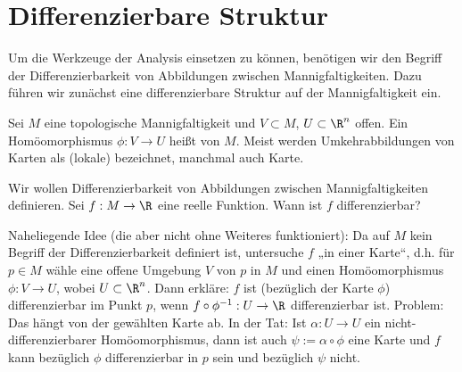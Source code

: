 
%

\section{Differenzierbare Struktur}

Um die Werkzeuge der Analysis einsetzen zu können, benötigen wir den Begriff der Differenzierbarkeit von Abbildungen zwischen Mannigfaltigkeiten.
Dazu führen wir zunächst eine differenzierbare Struktur auf der Mannigfaltigkeit ein.

\begin{df} \label{1.5}
    Sei $M$ eine topologische Mannigfaltigkeit und $V \subset M$, $U \subset \R^n$ offen.
    Ein Homöomorphismus $\phi: V \to U$ heißt  von $M$.
    Meist werden Umkehrabbildungen von Karten als (lokale)  bezeichnet, manchmal auch Karte.
\end{df}

Wir wollen Differenzierbarkeit von Abbildungen zwischen Mannigfaltigkeiten definieren.
Sei $f: M \to \R$ eine reelle Funktion.
Wann ist $f$ differenzierbar?

Naheliegende Idee (die aber nicht ohne Weiteres funktioniert):
Da auf $M$ kein Begriff der Differenzierbarkeit definiert ist, untersuche $f$ „in einer Karte“, d.h. für $p \in M$ wähle eine offene Umgebung $V$ von $p$ in $M$ und einen Homöomorphismus $\phi: V \to U$, wobei $U \subset \R^n$.
Dann erkläre: $f$ ist (bezüglich der Karte $\phi$) differenzierbar im Punkt $p$, wenn
\begin{math}
    f \circ \phi^{-1}: U \to \R
\end{math}
differenzierbar ist.
Problem: Das hängt von der gewählten Karte ab.
In der Tat: Ist $\alpha: U \to U$ ein nicht-differenzierbarer Homöomorphismus, dann ist auch $\psi := \alpha \circ \phi$ eine Karte und $f$ kann bezüglich $\phi$ differenzierbar in $p$ sein und bezüglich $\psi$ nicht.

